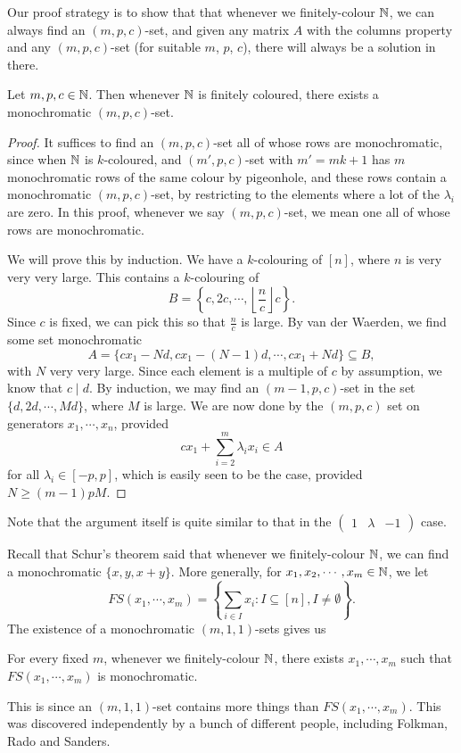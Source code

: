 \documentclass[a4paper]{article}
\begin{document}
Our proof strategy is to show that that whenever we finitely-colour $\mathbb{N}$, we can always find an $(m, p, c)$-set, and given any matrix $A$ with the columns property and any $(m, p, c)$-set (for suitable $m$, $p$, $c$), there will always be a solution in there.

\begin{prop}
  Let $m, p, c \in \mathbb{N}$. Then whenever $\mathbb{N}$ is finitely coloured, there exists a monochromatic $(m, p, c)$-set.
\end{prop}

\begin{proof}
  It suffices to find an $(m, p, c)$-set all of whose rows are monochromatic, since when $\mathbb{N}$ is $k$-coloured, and $(m', p, c)$-set with $m' = mk + 1$ has $m$ monochromatic rows of the same colour by pigeonhole, and these rows contain a monochromatic $(m, p, c)$-set, by restricting to the elements where a lot of the $\lambda_i$ are zero. In this proof, whenever we say $(m, p, c)$-set, we mean one all of whose rows are monochromatic.

  We will prove this by induction. We have a $k$-colouring of $[n]$, where $n$ is very very very large. This contains a $k$-colouring of
  \[
    B = \left\{c, 2c, \cdots, \left\lfloor \frac{n}{c}\right\rfloor c\right\}.
  \]
  Since $c$ is fixed, we can pick this so that $\frac{n}{c}$ is large. By van der Waerden, we find some set monochromatic
  \[
    A = \{c x_1 - Nd, cx_1 - (N - 1)d, \cdots, cx_1 + Nd \} \subseteq B,
  \]
  with $N$ very very large. Since each element is a multiple of $c$ by assumption, we know that $c \mid d$. By induction, we may find an $(m - 1, p, c)$-set in the set $\{d, 2d, \cdots, Md\}$, where $M$ is large. We are now done by the $(m, p, c)$ set on generators $x_1, \cdots, x_n$, provided
  \[
    c x_1 + \sum_{i = 2}^m \lambda_i x_i \in A
  \]
  for all $\lambda_i \in [-p, p]$, which is easily seen to be the case, provided $N \geq (m - 1) pM$.
\end{proof}
Note that the argument itself is quite similar to that in the $\begin{pmatrix}1 & \lambda & -1\end{pmatrix}$ case.

Recall that Schur's theorem said that whenever we finitely-colour $\mathbb{N}$, we can find a monochromatic $\{x, y , x + y\}$. More generally, for $x_1, x_2, \cdots, x_m \in \mathbb{N}$, we let
\[
  FS(x_1, \cdots, x_m) = \left\{\sum_{i \in I} x_i : I \subseteq [n], I \not= \emptyset\right\}.
\]
The existence of a monochromatic $(m, 1, 1)$-sets gives us
\begin{cor}
  For every fixed $m$, whenever we finitely-colour $\mathbb{N}$, there exists $x_1, \cdots, x_m$ such that $FS(x_1, \cdots, x_m)$ is monochromatic.
\end{cor}
This is since an $(m, 1, 1)$-set contains more things than $FS(x_1, \cdots, x_m)$. This was discovered independently by a bunch of different people, including Folkman, Rado and Sanders.
\end{document}
